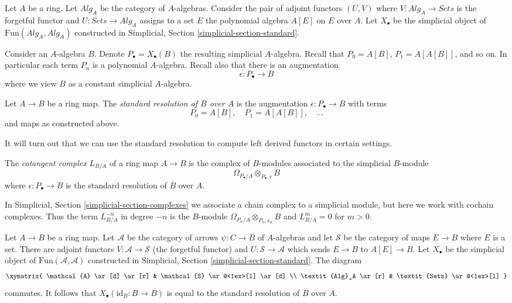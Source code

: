 \noindent
Let $A$ be a ring. Let $\textit{Alg}_A$ be the category of $A$-algebras.
Consider the pair of adjoint functors $(U, V)$ where
$V : \textit{Alg}_A \to \textit{Sets}$ is the forgetful functor and
$U : \textit{Sets} \to \textit{Alg}_A$ assigns to a set $E$ the polynomial
algebra $A[E]$ on $E$ over $A$. Let $X_\bullet$ be the simplicial object of
$\text{Fun}(\textit{Alg}_A, \textit{Alg}_A)$ constructed in
Simplicial, Section \ref{simplicial-section-standard}.

\medskip\noindent
Consider an $A$-algebra $B$. Denote $P_\bullet = X_\bullet(B)$ the resulting
simplicial $A$-algebra. Recall that $P_0 = A[B]$, $P_1 = A[A[B]]$, and so on.
In particular each term $P_n$ is a polynomial $A$-algebra.
Recall also that there is an augmentation
$$
\epsilon : P_\bullet \longrightarrow B
$$
where we view $B$ as a constant simplicial $A$-algebra.

\begin{definition}
\label{definition-standard-resolution}
Let $A \to B$ be a ring map. The {\it standard resolution of $B$ over $A$}
is the augmentation $\epsilon : P_\bullet \to B$ with terms
$$
P_0 = A[B],\quad P_1 = A[A[B]],\quad \ldots
$$
and maps as constructed above.
\end{definition}

\noindent
It will turn out that we can use the standard resolution
to compute left derived functors in certain settings.

\begin{definition}
\label{definition-cotangent-complex-ring-map}
The {\it cotangent complex} $L_{B/A}$ of a ring map $A \to B$
is the complex of $B$-modules associated to the simplicial $B$-module
$$
\Omega_{P_\bullet/A} \otimes_{P_\bullet, \epsilon} B
$$
where $\epsilon : P_\bullet \to B$ is the standard resolution
of $B$ over $A$.
\end{definition}

\noindent
In Simplicial, Section \ref{simplicial-section-complexes} we associate a
chain complex to a simplicial module, but here we work with cochain complexes.
Thus the term $L_{B/A}^{-n}$ in degree $-n$ is the $B$-module
$\Omega_{P_n/A} \otimes_{P_n, \epsilon_n} B$ and $L_{B/A}^m = 0$
for $m > 0$.

\begin{remark}
\label{remark-variant-cotangent-complex}
Let $A \to B$ be a ring map. Let $\mathcal{A}$ be the category of
arrows $\psi : C \to B$ of $A$-algebras and let $\mathcal{S}$ be
the category of maps $E \to B$ where $E$ is a set. There are adjoint
functors $V : \mathcal{A} \to \mathcal{S}$ (the forgetful functor)
and $U : \mathcal{S} \to \mathcal{A}$ which sends $E \to B$ to
$A[E] \to B$. Let $X_\bullet$ be the simplicial object of
$\text{Fun}(\mathcal{A}, \mathcal{A})$ constructed in
Simplicial, Section \ref{simplicial-section-standard}.
The diagram
$$
\xymatrix{
\mathcal{A} \ar[d] \ar[r] & \mathcal{S} \ar@<1ex>[l] \ar[d] \\
\textit{Alg}_A \ar[r] & \textit{Sets} \ar@<1ex>[l]
}
$$
commutes. It follows that $X_\bullet(\text{id}_B : B \to B)$
is equal to the standard resolution of $B$ over $A$.
\end{remark}

